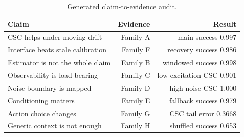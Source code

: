 \begin{table}[t]
\caption{Generated claim-to-evidence audit.}
\label{tab:claim-evidence}
\centering
\begin{tabular}{lrr}
\toprule
Claim & Evidence & Result \\
\midrule
CSC helps under moving drift & Family A & main success 0.997 \\
Interface beats stale calibration & Family F & recovery success 0.986 \\
Estimator is not the whole claim & Family B & windowed success 0.998 \\
Observability is load-bearing & Family C & low-excitation CSC 0.901 \\
Noise boundary is mapped & Family D & high-noise CSC 1.000 \\
Conditioning matters & Family E & fallback success 0.979 \\
Action choice changes & Family G & CSC tail error 0.3668 \\
Generic context is not enough & Family H & shuffled success 0.653 \\
\bottomrule
\end{tabular}
\end{table}
